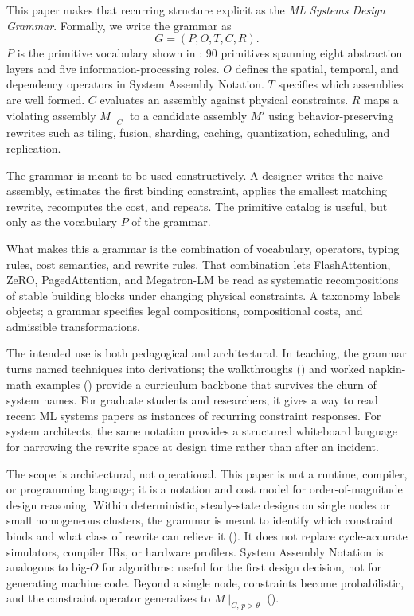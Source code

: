 \documentclass[10pt,twocolumn]{article}
\begin{document}
This paper makes that recurring structure explicit as the \emph{ML Systems Design Grammar}. Formally, we write the grammar as
\begin{equation}
\label{eq:grammar}
G = (P, O, T, C, R).
\end{equation}
$P$ is the primitive vocabulary shown in : 90 primitives spanning eight abstraction layers and five information-processing roles. $O$ defines the spatial, temporal, and dependency operators in System Assembly Notation. $T$ specifies which assemblies are well formed. $C$ evaluates an assembly against physical constraints. $R$ maps a violating assembly $M \mid_C$ to a candidate assembly $M'$ using behavior-preserving rewrites such as tiling, fusion, sharding, caching, quantization, scheduling, and replication.

The grammar is meant to be used constructively. A designer writes the naive assembly, estimates the first binding constraint, applies the smallest matching rewrite, recomputes the cost, and repeats. The primitive catalog is useful, but only as the vocabulary $P$ of the grammar.

What makes this a grammar is the combination of vocabulary, operators, typing rules, cost semantics, and rewrite rules. That combination lets FlashAttention, ZeRO, PagedAttention, and Megatron-LM be read as systematic recompositions of stable building blocks under changing physical constraints. A taxonomy labels objects; a grammar specifies legal compositions, compositional costs, and admissible transformations.

The intended use is both pedagogical and architectural. In teaching, the grammar turns named techniques into derivations; the walkthroughs () and worked napkin-math examples () provide a curriculum backbone that survives the churn of system names. For graduate students and researchers, it gives a way to read recent ML systems papers as instances of recurring constraint responses. For system architects, the same notation provides a structured whiteboard language for narrowing the rewrite space at design time rather than after an incident.

The scope is architectural, not operational. This paper is not a runtime, compiler, or programming language; it is a notation and cost model for order-of-magnitude design reasoning. Within deterministic, steady-state designs on single nodes or small homogeneous clusters, the grammar is meant to identify which constraint binds and what class of rewrite can relieve it (). It does not replace cycle-accurate simulators, compiler IRs, or hardware profilers. System Assembly Notation is analogous to big-$O$ for algorithms: useful for the first design decision, not for generating machine code. Beyond a single node, constraints become probabilistic, and the constraint operator generalizes to $M \mid_{C,\, p > \theta}$ ().
\end{document}
